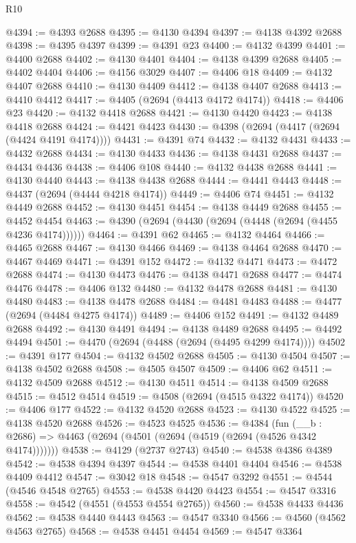 \begin{lexlean}{R10}
\begin{coremodule}
@4394 := @4393 @2688
@4395 := @4130 @4394
@4397 := @4138 @4392 @2688
@4398 := @4395 @4397
@4399 := @4391 @23
@4400 := @4132 @4399
@4401 := @4400 @2688
@4402 := @4130 @4401
@4404 := @4138 @4399 @2688
@4405 := @4402 @4404
@4406 := @4156 @3029
@4407 := @4406 @18
@4409 := @4132 @4407 @2688
@4410 := @4130 @4409
@4412 := @4138 @4407 @2688
@4413 := @4410 @4412
@4417 := @4405 (@2694 (@4413 @4172 @4174))
@4418 := @4406 @23
@4420 := @4132 @4418 @2688
@4421 := @4130 @4420
@4423 := @4138 @4418 @2688
@4424 := @4421 @4423
@4430 := @4398 (@2694 (@4417 (@2694 (@4424 @4191 @4174))))
@4431 := @4391 @74
@4432 := @4132 @4431
@4433 := @4432 @2688
@4434 := @4130 @4433
@4436 := @4138 @4431 @2688
@4437 := @4434 @4436
@4438 := @4406 @108
@4440 := @4132 @4438 @2688
@4441 := @4130 @4440
@4443 := @4138 @4438 @2688
@4444 := @4441 @4443
@4448 := @4437 (@2694 (@4444 @4218 @4174))
@4449 := @4406 @74
@4451 := @4132 @4449 @2688
@4452 := @4130 @4451
@4454 := @4138 @4449 @2688
@4455 := @4452 @4454
@4463 := @4390 (@2694 (@4430 (@2694 (@4448 (@2694 (@4455 @4236 @4174))))))
@4464 := @4391 @62
@4465 := @4132 @4464
@4466 := @4465 @2688
@4467 := @4130 @4466
@4469 := @4138 @4464 @2688
@4470 := @4467 @4469
@4471 := @4391 @152
@4472 := @4132 @4471
@4473 := @4472 @2688
@4474 := @4130 @4473
@4476 := @4138 @4471 @2688
@4477 := @4474 @4476
@4478 := @4406 @132
@4480 := @4132 @4478 @2688
@4481 := @4130 @4480
@4483 := @4138 @4478 @2688
@4484 := @4481 @4483
@4488 := @4477 (@2694 (@4484 @4275 @4174))
@4489 := @4406 @152
@4491 := @4132 @4489 @2688
@4492 := @4130 @4491
@4494 := @4138 @4489 @2688
@4495 := @4492 @4494
@4501 := @4470 (@2694 (@4488 (@2694 (@4495 @4299 @4174))))
@4502 := @4391 @177
@4504 := @4132 @4502 @2688
@4505 := @4130 @4504
@4507 := @4138 @4502 @2688
@4508 := @4505 @4507
@4509 := @4406 @62
@4511 := @4132 @4509 @2688
@4512 := @4130 @4511
@4514 := @4138 @4509 @2688
@4515 := @4512 @4514
@4519 := @4508 (@2694 (@4515 @4322 @4174))
@4520 := @4406 @177
@4522 := @4132 @4520 @2688
@4523 := @4130 @4522
@4525 := @4138 @4520 @2688
@4526 := @4523 @4525
@4536 := @4384
    (fun (__b : @2686) => @4463 (@2694 (@4501 (@2694 (@4519 (@2694 (@4526 @4342 @4174)))))))
@4538 := @4129 (@2737 @2743)
@4540 := @4538 @4386 @4389
@4542 := @4538 @4394 @4397
@4544 := @4538 @4401 @4404
@4546 := @4538 @4409 @4412
@4547 := @3042 @18
@4548 := @4547 @3292
@4551 := @4544 (@4546 @4548 @2765)
@4553 := @4538 @4420 @4423
@4554 := @4547 @3316
@4558 := @4542 (@4551 (@4553 @4554 @2765))
@4560 := @4538 @4433 @4436
@4562 := @4538 @4440 @4443
@4563 := @4547 @3340
@4566 := @4560 (@4562 @4563 @2765)
@4568 := @4538 @4451 @4454
@4569 := @4547 @3364

\end{coremodule}
\end{lexlean}
